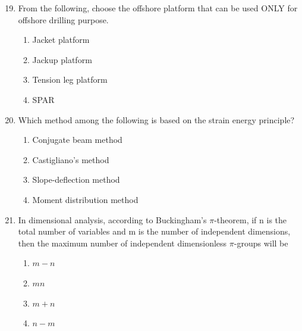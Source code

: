 \documentclass[journal]{IEEEtran}
\theoremstyle{remark}
\begin{document}
\begin{enumerate}[itemsep=1em]
\setcounter{enumi}{18}
\item From the following, choose the offshore platform that can be used ONLY for offshore drilling purpose. 

\begin{enumerate}[leftmargin=2.5em, labelsep=0.5em, itemsep=0.5em]
      \item Jacket platform 
      \item Jackup platform 
      \item Tension leg platform 
      \item SPAR
\end{enumerate}

\end{enumerate}

\begin{enumerate}[itemsep=1em]
\setcounter{enumi}{19}
\item Which method among the following is based on the strain energy principle? 
\begin{enumerate}[leftmargin=2.5em,labelsep=0.5em,itemsep=0.5em]
    \item Conjugate beam method 
    \item Castigliano's method
    \item Slope-deflection method 
    \item Moment distribution method 
\end{enumerate}
\end{enumerate}

\begin{enumerate}[itemsep=1em]
\setcounter{enumi}{20}
\item In dimensional analysis, according to Buckingham's $\pi$-theorem, if n is the total number of variables and m is the number of independent dimensions, then the maximum number of independent dimensionless $\pi$-groups will be 
\begin{multicols}{4}
\begin{enumerate}
       \item $m-n$
       \item $mn$
       \item $m+n$
       \item $n-m$
\end{enumerate}
\end{multicols}
\end{enumerate}
\end{document}
